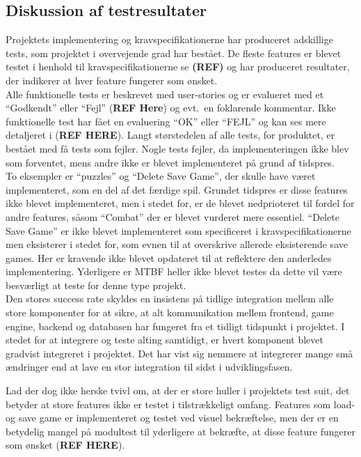 \subsection{Diskussion af testresultater}
Projektets implementering og kravspecifikationerne har produceret adskillige tests, som 
projektet i overvejende grad har bestået. De fleste features er blevet
testet i henhold til kravspecifikationerne se \textbf{(REF)} og har produceret 
resultater, der indikerer at hver feature fungerer som ønsket. \\

Alle funktionelle tests er beskrevet med user-stories og er evalueret med et ``Godkendt''
eller ``Fejl'' (\textbf{REF Here}) og evt.\ en foklarende kommentar. Ikke funktionelle 
test har fået en evaluering ``OK'' eller ``FEJL'' og kan ses mere detaljeret i (\textbf{REF HERE}).
Langt størstedelen af alle tests, for produktet, er bestået med få tests som fejler. 
Nogle tests fejler, da implementeringen ikke blev som forventet, mens andre ikke er blevet 
implementeret på grund af tidspres. \\

To eksempler er ``puzzles'' og ``Delete Save Game'', der skulle have været implementeret, som en del af det færdige spil.
Grundet tidspres er disse features ikke blevet implementeret, men i stedet for, er de blevet
nedprioteret til fordel for andre features, såsom ``Combat'' der er blevet vurderet mere essentiel.
``Delete Save Game'' er ikke blevet implementeret som specificeret i kravspecifikationerne men
eksisterer i stedet for, som evnen til at overskrive allerede eksisterende save games. Her er 
kravende ikke blevet opdateret til at reflektere den anderledes implementering. Yderligere er MTBF heller ikke blevet testes da dette vil være besværligt at teste for denne type projekt.\\

Den stores success rate skyldes en insistens på tidlige integration mellem alle store komponenter for at sikre, at 
alt kommunikation mellem frontend, game engine, backend og databasen har fungeret fra et tidligt 
tidspunkt i projektet. I stedet for at integrere og teste alting samtidigt, er hvert komponent 
blevet gradvist integreret i projektet. Det har vist sig nemmere at integrerer mange små ændringer
end at lave en stor integration til sidst i udviklingsfasen.

Lad der dog ikke herske tvivl om, at der er store huller i projektets test suit, det
betyder at store features ikke er testet i tilstrækkeligt omfang. Features som load- og save game er implementeret og testet ved visuel bekræftelse, men der er en betydelig mangel på modultest til yderligere at bekræfte, at disse feature fungerer som ønsket (\textbf{REF HERE}). \\